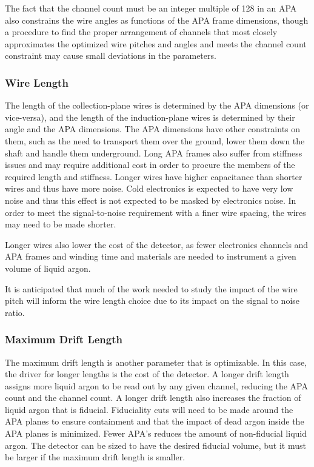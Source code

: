 The fact that the channel count must be an integer multiple of 128 in
an APA also constrains the wire angles as functions of the APA frame
dimensions, though a procedure to find the proper arrangement of
channels that most closely approximates the optimized wire pitches and
angles and meets the channel count constraint may cause small
deviations in the parameters.

\subsubsection{Wire Length}

The length of the collection-plane wires is determined by the APA dimensions (or vice-versa),
and the length of the induction-plane wires is determined by their angle and the APA
dimensions.  The APA dimensions have other constraints on them, such as the need to transport
them over the ground, lower them down the shaft and handle them underground.  Long APA frames
also suffer from stiffness issues and may require additional cost in order to procure the
members of the required length and stiffness.  Longer wires have higher capacitance than shorter
wires and thus have more noise.  Cold electronics is expected to have very low noise and thus
this effect is not expected to be masked by electronics noise.  In order to meet the signal-to-noise
requirement with a finer wire spacing, the wires may need to be made shorter.

Longer wires also lower the cost of the detector, as fewer electronics channels and APA frames
and winding time and materials are needed to instrument a given volume of liquid argon.

It is anticipated that much of the work needed to study the impact of the wire pitch will inform
the wire length choice due to its impact on the signal to noise ratio.

\subsubsection{Maximum Drift Length}

The maximum drift length is another parameter that is optimizable.  In
this case, the driver for longer lengths is the cost of the detector.
A longer drift length assigns more liquid argon to be read out by any
given channel, reducing the APA count and the channel count.  A longer
drift length also increases the fraction of liquid argon that is
fiducial.  Fiduciality cuts will need to be made around the APA planes
to ensure containment and that the impact of dead argon inside the APA
planes is minimized.  Fewer APA's reduces the amount of non-fiducial
liquid argon.  The detector can be sized to have the desired fiducial
volume, but it must be larger if the maximum drift length is smaller.

